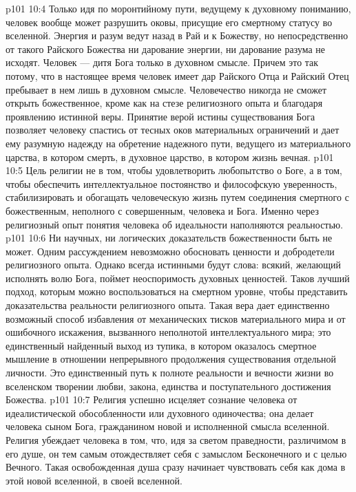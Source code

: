 \vs p101 10:4 Только идя по моронтийному пути, ведущему к духовному пониманию, человек вообще может разрушить оковы, присущие его смертному статусу во вселенной. Энергия и разум ведут назад в Рай и к Божеству, но непосредственно от такого Райского Божества ни дарование энергии, ни дарование разума не исходят. Человек --- дитя Бога только в духовном смысле. Причем это так потому, что в настоящее время человек имеет дар Райского Отца и Райский Отец пребывает в нем лишь в духовном смысле. Человечество никогда не сможет открыть божественное, кроме как на стезе религиозного опыта и благодаря проявлению истинной веры. Принятие верой истины существования Бога позволяет человеку спастись от тесных оков материальных ограничений и дает ему разумную надежду на обретение надежного пути, ведущего из материального царства, в котором смерть, в духовное царство, в котором жизнь вечная.
\vs p101 10:5 \pc Цель религии не в том, чтобы удовлетворить любопытство о Боге, а в том, чтобы обеспечить интеллектуальное постоянство и философскую уверенность, стабилизировать и обогащать человеческую жизнь путем соединения смертного с божественным, неполного с совершенным, человека и Бога. Именно через религиозный опыт понятия человека об идеальности наполняются реальностью.
\vs p101 10:6 \pc Ни научных, ни логических доказательств божественности быть не может. Одним рассуждением невозможно обосновать ценности и добродетели религиозного опыта. Однако всегда истинными будут слова: всякий, желающий исполнять волю Бога, поймет неоспоримость духовных ценностей. Таков лучший подход, которым можно воспользоваться на смертном уровне, чтобы представить доказательства реальности религиозного опыта. Такая вера дает единственно возможный способ избавления от механических тисков материального мира и от ошибочного искажения, вызванного неполнотой интеллектуального мира; это единственный найденный выход из тупика, в котором оказалось смертное мышление в отношении непрерывного продолжения существования отдельной личности. Это единственный путь к полноте реальности и вечности жизни во вселенском творении любви, закона, единства и поступательного достижения Божества.
\vs p101 10:7 Религия успешно исцеляет сознание человека от идеалистической обособленности или духовного одиночества; она делает человека сыном Бога, гражданином новой и исполненной смысла вселенной. Религия убеждает человека в том, что, идя за светом праведности, различимом в его душе, он тем самым отождествляет себя с замыслом Бесконечного и с целью Вечного. Такая освобожденная душа сразу начинает чувствовать себя как дома в этой новой вселенной, в своей вселенной.
